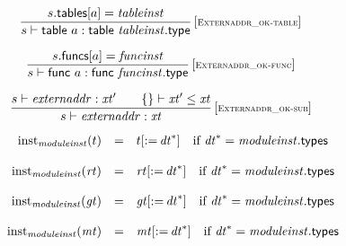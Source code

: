 $$
\begin{array}{@{}c@{}}\displaystyle
\frac{
s{.}\mathsf{tables}{}[a] = {\mathit{tableinst}}
}{
s \vdash \mathsf{table}~a : \mathsf{table}~{\mathit{tableinst}}{.}\mathsf{type}
} \, {[\textsc{\scriptsize Externaddr\_ok{-}table}]}
\qquad
\end{array}
$$

$$
\begin{array}{@{}c@{}}\displaystyle
\frac{
s{.}\mathsf{funcs}{}[a] = {\mathit{funcinst}}
}{
s \vdash \mathsf{func}~a : \mathsf{func}~{\mathit{funcinst}}{.}\mathsf{type}
} \, {[\textsc{\scriptsize Externaddr\_ok{-}func}]}
\qquad
\end{array}
$$

$$
\begin{array}{@{}c@{}}\displaystyle
\frac{
s \vdash {\mathit{externaddr}} : {\mathit{xt}'}
 \qquad
\{  \} \vdash {\mathit{xt}'} \leq {\mathit{xt}}
}{
s \vdash {\mathit{externaddr}} : {\mathit{xt}}
} \, {[\textsc{\scriptsize Externaddr\_ok{-}sub}]}
\qquad
\end{array}
$$

$$
\begin{array}[t]{@{}lcl@{}l@{}}
{{\mathrm{inst}}}_{{\mathit{moduleinst}}}(t) & = & {t}{{}[ {:=}\, {{\mathit{dt}}^\ast} ]} & \quad \mbox{if}~ {{\mathit{dt}}^\ast} = {\mathit{moduleinst}}{.}\mathsf{types} \\
\end{array}
$$

$$
\begin{array}[t]{@{}lcl@{}l@{}}
{{\mathrm{inst}}}_{{\mathit{moduleinst}}}({\mathit{rt}}) & = & {{\mathit{rt}}}{{}[ {:=}\, {{\mathit{dt}}^\ast} ]} & \quad \mbox{if}~ {{\mathit{dt}}^\ast} = {\mathit{moduleinst}}{.}\mathsf{types} \\
\end{array}
$$

$$
\begin{array}[t]{@{}lcl@{}l@{}}
{{\mathrm{inst}}}_{{\mathit{moduleinst}}}({\mathit{gt}}) & = & {{\mathit{gt}}}{{}[ {:=}\, {{\mathit{dt}}^\ast} ]} & \quad \mbox{if}~ {{\mathit{dt}}^\ast} = {\mathit{moduleinst}}{.}\mathsf{types} \\
\end{array}
$$

$$
\begin{array}[t]{@{}lcl@{}l@{}}
{{\mathrm{inst}}}_{{\mathit{moduleinst}}}({\mathit{mt}}) & = & {{\mathit{mt}}}{{}[ {:=}\, {{\mathit{dt}}^\ast} ]} & \quad \mbox{if}~ {{\mathit{dt}}^\ast} = {\mathit{moduleinst}}{.}\mathsf{types} \\
\end{array}
$$

